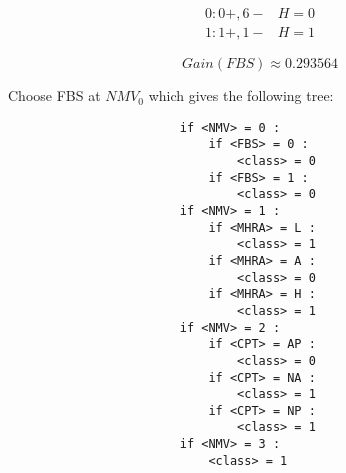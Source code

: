 \begin{enumerate}
\begin{enumerate}
\begin{enumerate}
\begin{enumerate}
								\[
									\begin{array}{l|l}
										0: 0+, 6- & H = 0 \\
										1: 1+, 1- & H = 1
									\end{array}
								\]
								
								\[
									Gain(FBS) \approx 0.293564
								\]
								
						\end{enumerate}
						
					Choose FBS at \(NMV_0\) which gives the following tree:
					
					\begin{lstlisting}
						if <NMV> = 0 :
							if <FBS> = 0 :
								<class> = 0
							if <FBS> = 1 :
								<class> = 0
						if <NMV> = 1 :
							if <MHRA> = L :
								<class> = 1
							if <MHRA> = A :
								<class> = 0
							if <MHRA> = H :
								<class> = 1
						if <NMV> = 2 :
							if <CPT> = AP :
								<class> = 0
							if <CPT> = NA :
								<class> = 1
							if <CPT> = NP :
								<class> = 1
						if <NMV> = 3 :
							<class> = 1
					\end{lstlisting}
	

				\end{enumerate}
				
		\end{enumerate}

\end{enumerate}





